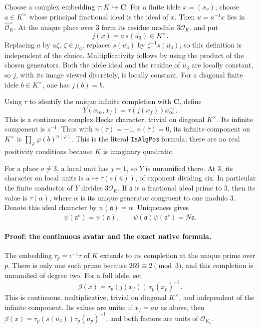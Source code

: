 Choose a complex embedding \(\tau:K\hookrightarrow\mathbf C\).
For a finite idele \(x=(x_v)\), choose \(a\in K^\times\) whose principal
fractional ideal is the ideal of \(x\).  Then \(u=a^{-1}x\) lies in
\(\widehat{\mathcal O}_K^{\times}\).  At the unique place over \(3\)
form its residue modulo \(3\mathcal O_K\), and put
\[
 j(x)=a\,s(\overline{u_3})\in K^\times.
 \tag{G106T.4}
\]
Replacing \(a\) by \(a\zeta\), \(\zeta\in\mu_6\), replaces
\(s(\overline{u_3})\) by \(\zeta^{-1}s(\overline{u_3})\), so this
definition is independent of the choice.  Multiplicativity follows by
using the product of the chosen generators.  Both the idele ideal and
the residue of \(u_3\) are locally constant, so \(j\), with its image
viewed discretely, is locally constant.  For a diagonal finite idele
\(b\in K^\times\), one has \(j(b)=b\).

Using \(\tau\) to identify the unique infinite completion with
\(\mathbf C\), define
\[
 Y(x_\infty,x_f)=\tau(j(x_f))x_\infty^{-1}.
 \tag{G106T.5}
\]
This is a continuous complex Hecke character, trivial on diagonal
\(K^\times\).  Its infinite component is \(z^{-1}\).  Thus with
\(n(\tau)=-1\), \(n(\overline\tau)=0\), its infinite component on
\(K^\times\) is \(\prod_\varphi\varphi(b)^{n(\varphi)}\).  This is
the literal \texttt{IsAlgPos} formula; there are no real positivity
conditions because \(K\) is imaginary quadratic.

For a place \(v\ne3\), a local unit has \(j=1\), so \(Y\) is
unramified there.  At \(3\), its character on local units is
\(u\mapsto\tau(s(\bar u))\), of exponent dividing six.  In particular
the finite conductor of \(Y\) divides \(3\mathcal O_K\).  If
\(\mathfrak a\) is a fractional ideal prime to \(3\), then its value
is \(\tau(\alpha)\), where \(\alpha\) is its unique generator
congruent to one modulo \(3\).  Denote this ideal character by
\(\psi(\mathfrak a)=\alpha\).  Uniqueness gives
\[
 \psi(\mathfrak a^c)=\overline{\psi(\mathfrak a)},\qquad
 \psi(\mathfrak a)\psi(\mathfrak a^c)=N\mathfrak a.
 \tag{G106T.6}
\]

\paragraph{Proof: the continuous avatar and the exact native formula.}
The embedding \(\tau_p=\iota^{-1}\tau\) of \(K\) extends to its
completion at the unique prime over \(p\).  There is only one such
prime because \(269\equiv2\pmod3\), and this completion is unramified
of degree two.  For a full idele, set
\[
 \beta(x)=\tau_p(j(x_f))\,\tau_p(x_p)^{-1}.
 \tag{G106T.7}
\]
This is continuous, multiplicative, trivial on diagonal \(K^\times\),
and independent of the infinite component.  Its values are units:
if \(x_f=a u\) as above, then
\(\beta(x)=\tau_p(s(\overline{u_3}))\tau_p(u_p)^{-1}\), and both
factors are units of \(\mathcal O_{K_p}\).

